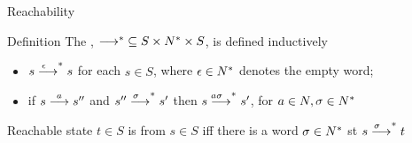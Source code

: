 \documentclass[aspectratio=169]{beamer}
\begin{document}



\begin{slide}{Reachability}
\small
\begin{block}{Definition}
The , ${\longrightarrow^*} \subseteq S \times N^* \times S$, is defined inductively
\begin{itemize}
\item $s \stackrel{\!\!\!\!\!\epsilon}{\longrightarrow}^* s$ for each $s \in S$, where $\epsilon \in N^*$ denotes the empty \alert{word};
\item if  $s \stackrel{a}{\longrightarrow} s''$  and $s'' \stackrel{\!\!\!\!\!\sigma}{\longrightarrow}^* s'$ then $s \stackrel{\!\!\!\!\!a \sigma}{\longrightarrow}^* s'$, for $a \in N, \sigma \in N^*$
\end{itemize}
\end{block}

\begin{block}{Reachable state}
$t \in S$ is  from $s \in S$ iff there is a \alert{word} $\sigma \in N^*$ st $s \stackrel{\!\!\!\!\!\sigma}{\longrightarrow}^* t$
\end{block}

\end{slide}
\end{document}

